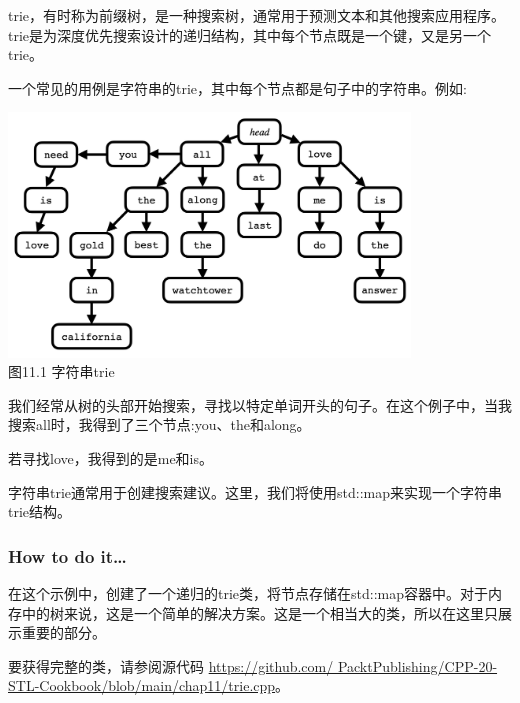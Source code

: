 
trie，有时称为前缀树，是一种搜索树，通常用于预测文本和其他搜索应用程序。trie是为深度优先搜索设计的递归结构，其中每个节点既是一个键，又是另一个trie。

一个常见的用例是字符串的trie，其中每个节点都是句子中的字符串。例如:

\begin{center}
\includegraphics[width=0.8\textwidth]{content/chapter11/images/1.png}\\
图11.1 字符串trie
\end{center}

我们经常从树的头部开始搜索，寻找以特定单词开头的句子。在这个例子中，当我搜索all时，我得到了三个节点:you、the和along。

若寻找love，我得到的是me和is。

字符串trie通常用于创建搜索建议。这里，我们将使用std::map来实现一个字符串trie结构。

\subsubsection{How to do it…}

在这个示例中，创建了一个递归的trie类，将节点存储在std::map容器中。对于内存中的树来说，这是一个简单的解决方案。这是一个相当大的类，所以在这里只展示重要的部分。

要获得完整的类，请参阅源代码 \url{https://github.com/ PacktPublishing/CPP-20-STL-Cookbook/blob/main/chap11/trie.cpp}。

